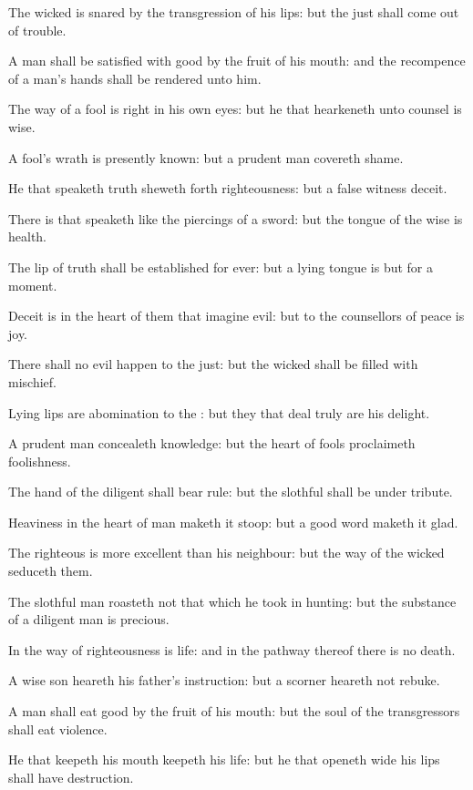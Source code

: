 \Verse The wicked is snared by the transgression of his lips: but the just shall come out of trouble.

\Verse A man shall be satisfied with good by the fruit of his mouth: and the recompence of a man's hands shall be rendered unto him.

\Verse The way of a fool is right in his own eyes: but he that hearkeneth unto counsel is wise.

\Verse A fool's wrath is presently known: but a prudent man covereth shame.

\Verse He that speaketh truth sheweth forth righteousness: but a false witness deceit.

\Verse There is that speaketh like the piercings of a sword: but the tongue of the wise is health.

\Verse The lip of truth shall be established for ever: but a lying tongue is but for a moment.

\Verse Deceit is in the heart of them that imagine evil: but to the counsellors of peace is joy.

\Verse There shall no evil happen to the just: but the wicked shall be filled with mischief.

\Verse Lying lips are abomination to the \LORD: but they that deal truly are his delight.

\Verse A prudent man concealeth knowledge: but the heart of fools proclaimeth foolishness.

\Verse The hand of the diligent shall bear rule: but the slothful shall be under tribute.

\Verse Heaviness in the heart of man maketh it stoop: but a good word maketh it glad.

\Verse The righteous is more excellent than his neighbour: but the way of the wicked seduceth them.

\Verse The slothful man roasteth not that which he took in hunting: but the substance of a diligent man is precious.

\Verse In the way of righteousness is life: and in the pathway thereof there is no death.


\Chapter
\Verse A wise son heareth his father's instruction: but a scorner heareth not rebuke.

\Verse A man shall eat good by the fruit of his mouth: but the soul of the transgressors shall eat violence.

\Verse He that keepeth his mouth keepeth his life: but he that openeth wide his lips shall have destruction.

